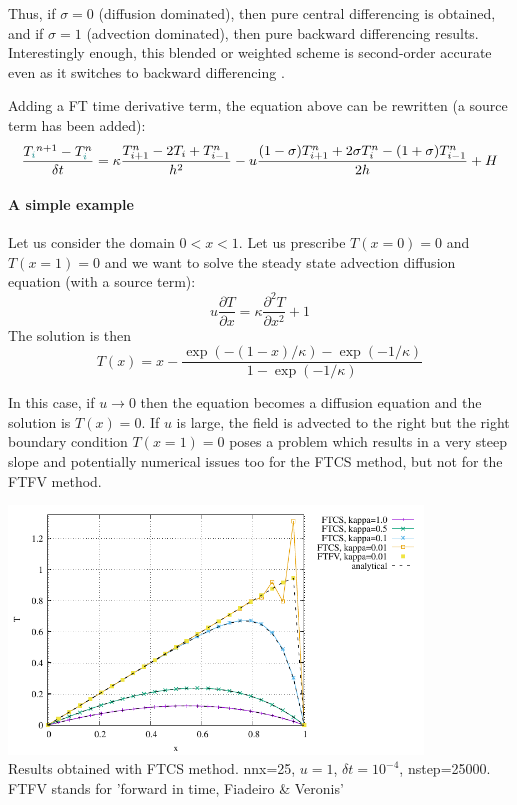 Thus, if $\sigma = 0$ (diffusion dominated), then pure central differencing is obtained, and if
$\sigma = 1$ (advection dominated), then pure backward differencing results. Interestingly
enough, this blended or weighted scheme is second-order accurate even as it switches
to backward differencing \cite{five77}. 

Adding a FT time derivative term, the equation above can be rewritten (a source
term has been added):
\[
\frac{T_{\color{teal}i}^{n+1}-T^n_{\color{teal}i}}{\delta t} 
=
\kappa \frac{T_{i+1}^n-2T_i + T_{i-1}^n}{h^2}
- u \frac{(1-\sigma) T_{i+1}^n+2\sigma T_i^n -(1+\sigma)T_{i-1}^n}{2 h} +H 
\]


\paragraph{A simple example} Let us consider the domain $0<x<1$.
Let us prescribe $T(x=0)=0$  and $T(x=1)=0$ and we want to solve 
the steady state advection diffusion equation (with a source term):
\begin{equation}
u \frac{\partial T}{\partial x} = \kappa \frac{\partial^2 T}{\partial x^2} + 1
\label{eq:fdmadvdiff2}
\end{equation}
The solution is then 
\begin{equation}
T(x)=x - \frac{\exp (-(1-x)/\kappa) -\exp (-1/\kappa)  }{1-\exp (-1/\kappa)}
\label{eq:fdmadvdiff1}
\end{equation}

In this case, if $u\rightarrow 0$ then the equation becomes a diffusion equation
and the solution is $T(x)=0$. If $u$ is large, the field is advected to the right
but the right boundary condition $T(x=1)=0$ poses a problem which results in a very steep slope
and potentially numerical issues too for the FTCS method, but not for the FTFV method.

\begin{center}
\includegraphics[width=11cm]{images/fdm/adv_diff/T.pdf}\\
{\captionfont Results obtained with FTCS method. nnx=25, $u=1$, $\delta t=10^{-4}$, 
nstep=25000. FTFV stands for 'forward in time, Fiadeiro \& Veronis'}
\end{center}

